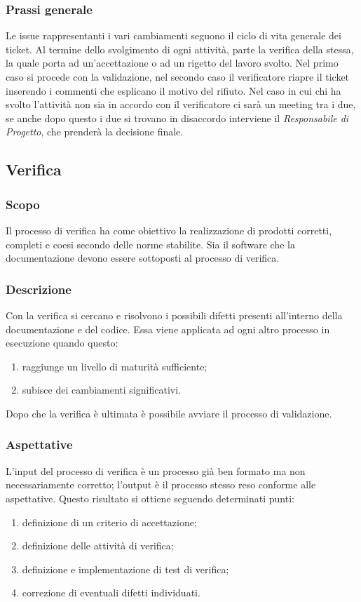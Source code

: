 \subsubsection{Prassi generale}
Le issue rappresentanti i vari cambiamenti seguono il ciclo di vita generale dei ticket.
Al termine dello svolgimento di ogni attività,  parte la verifica della stessa,  la quale porta ad un'accettazione o ad un rigetto
del lavoro svolto.  Nel primo caso si procede con la validazione, nel secondo caso il verificatore riapre il ticket inserendo i commenti
che esplicano il motivo del rifiuto. Nel caso in cui chi ha svolto l'attività non sia in accordo con il verificatore ci sarà un meeting tra i due, se anche
dopo questo i due si trovano in disaccordo interviene il \textit{Responsabile di Progetto}, che prenderà la decisione finale.

\subsection{Verifica} \label{_verifica}
\subsubsection{Scopo}
Il processo di verifica ha come obiettivo la realizzazione di prodotti corretti, completi e coesi secondo delle norme stabilite. Sia il software che la documentazione devono essere sottoposti al processo di verifica.

\subsubsection{Descrizione}
Con la verifica si cercano e  risolvono i possibili difetti presenti all'interno della documentazione e del codice. Essa viene applicata ad ogni altro processo in esecuzione quando questo:
\begin{enumerate}
    \item raggiunge un livello di maturità sufficiente;
    \item subisce dei cambiamenti significativi.
\end{enumerate}
Dopo che la verifica è ultimata è possibile avviare il processo di validazione.

\subsubsection{Aspettative}
L'input del processo di verifica è un processo già ben formato ma non necessariamente corretto; l'output è il processo stesso reso conforme alle aspettative. Questo risultato si ottiene seguendo determinati punti:
\begin{enumerate}
    \item definizione di un criterio di accettazione;
    \item definizione delle attività di verifica;
    \item definizione e implementazione di test di verifica;
    \item correzione di eventuali difetti individuati.
\end{enumerate}

